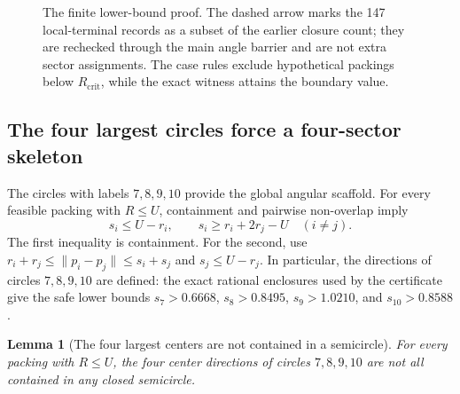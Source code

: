 \documentclass[11pt,a4paper]{article}
\newtheorem{lemma}[theorem]{Lemma}
\theoremstyle{remark}
\newcommand{\norm}[1]{\lVert #1\rVert}
\begin{document}
\begin{figure}[htbp]
\caption{The finite lower-bound proof. The dashed arrow marks the 147
local-terminal records as a subset of the earlier closure count; they are
rechecked through the main angle barrier and are not extra sector assignments.
The case rules exclude hypothetical packings below $R_{\mathrm{crit}}$,
while the exact witness attains the boundary value.}
\label{fig:proof-flow}
\end{figure}

\subsection{The four largest circles force a four-sector skeleton}
\label{sec:large-skeleton}

The circles with labels $7,8,9,10$ provide the global angular scaffold.
For every feasible packing with $R\le U$, containment and pairwise
non-overlap imply
\begin{equation}
  s_i\le U-r_i,\qquad
  s_i\ge r_i+2r_j-U\quad(i\ne j).
  \label{eq:large-radial-bounds}
\end{equation}
The first inequality is containment.  For the second, use
$r_i+r_j\le\norm{p_i-p_j}\le s_i+s_j$ and $s_j\le U-r_j$.
In particular, the directions of circles $7,8,9,10$ are defined: the exact
rational enclosures used by the certificate give the safe lower bounds
$s_7>0.6668$, $s_8>0.8495$, $s_9>1.0210$, and $s_{10}>0.8588$.

\begin{lemma}[The four largest centers are not contained in a semicircle]
\label{lem:large-four-semicircle}
For every packing with $R\le U$, the four center directions of circles
$7,8,9,10$ are not all contained in any closed semicircle.
\end{lemma}
\end{document}

